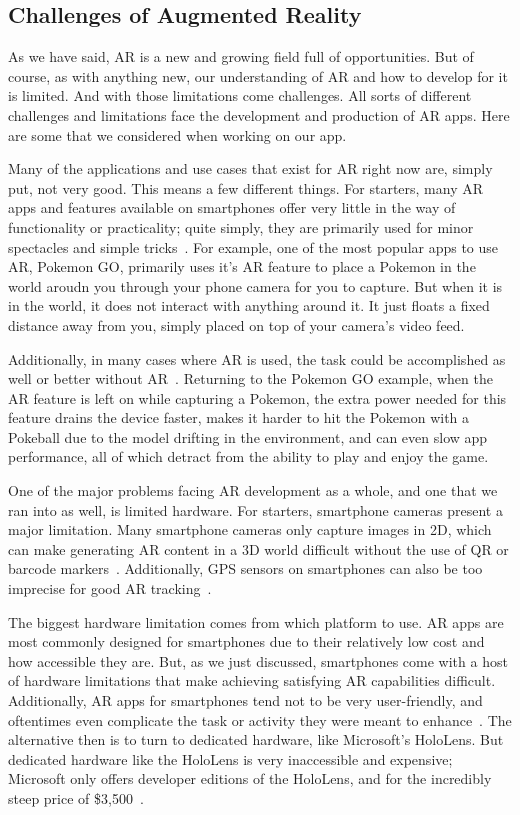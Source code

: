 \documentclass[a4paper, 10pt, american, titlepage]{article}
\begin{document}
\subsection{Challenges of Augmented Reality}
\label{sec:challengesOfAugmentedReality}

As we have said, AR is a new and growing field full of opportunities. But of course,
as with anything new, our understanding of AR and how to develop for it is limited.
And with those limitations come challenges. All sorts of different challenges and
limitations face the development and production of AR apps. Here are some that
we considered when working on our app.

Many of the applications and use cases that exist for AR right now are, simply put,
not very good. This means a few different things. For starters, many AR apps and
features available on smartphones offer very little in the way of functionality or
practicality; quite simply, they are primarily used for minor spectacles and simple
tricks~\autocite{theappsolutions2018}. For example, one of the most popular apps
to use AR, Pokemon GO, primarily uses it's AR feature to place a Pokemon in the
world aroudn you through your phone camera for you to capture. But when it is in
the world, it does not interact with anything around it. It just floats a fixed distance
away from you, simply placed on top of your camera's video feed. 

Additionally, in many cases where AR is used, the task could be accomplished as well 
or better without AR~\autocite{theappsolutions2018}. Returning to the Pokemon GO
example, when the AR feature is left on while capturing a Pokemon, the extra power
needed for this feature drains the device faster, makes it harder to hit the Pokemon
with a Pokeball due to the model drifting in the environment, and can even slow app
performance, all of which detract from the ability to play and enjoy the game. 

One of the major problems facing AR development as a whole, and one that we
ran into as well, is limited hardware. For starters, smartphone cameras present
a major limitation. Many smartphone cameras only capture images in 2D, which can
make generating AR content in a 3D world difficult without the use of QR or barcode
markers~\autocite{geospatialworld2018}. Additionally, GPS sensors on smartphones
can also be too imprecise for good AR tracking~\autocite{geospatialworld2018}.

The biggest hardware limitation comes from which platform to use. AR apps are most
commonly designed for smartphones due to their relatively low cost and how accessible
they are. But, as we just discussed, smartphones come with a host of hardware
limitations that make achieving satisfying AR capabilities difficult. Additionally, AR apps
for smartphones tend not to be very user-friendly, and oftentimes even complicate
the task or activity they were meant to enhance~\autocite{theappsolutions2018}.
The alternative then is to turn to dedicated hardware, like Microsoft's HoloLens. 
But dedicated hardware like the HoloLens is very inaccessible and expensive; 
Microsoft only offers developer editions of the HoloLens, and for the incredibly steep 
price of \$3,500~\autocite{microsoft2019}. 
\end{document}
